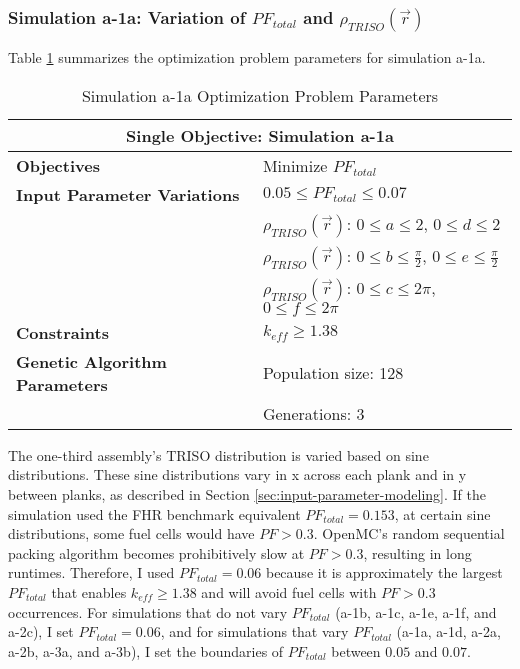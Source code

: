 \subsubsection{Simulation a-1a: Variation of $PF_{total}$ and $\rho_{TRISO}(\vec{r})$}
Table \ref{tab:simulationa1a}  summarizes the optimization problem parameters for 
simulation a-1a.
\begin{table}[htbp!]
    \centering
    \onehalfspacing
    \caption{Simulation a-1a Optimization Problem Parameters}
	\label{tab:simulationa1a}
    \footnotesize
    \begin{tabular}{l|p{5.3cm}}
    \hline 
    \multicolumn{2}{c}{\textbf{Single Objective: Simulation a-1a}} \\
    \hline 
    \textbf{Objectives} & Minimize $PF_{total}$ \\
    \hline 
    \textbf{Input Parameter Variations} & $0.05 \leq PF_{total} \leq 0.07$ \\
    & $\rho_{TRISO}(\vec{r})$: $0 \leq a \leq 2$, $0 \leq d \leq 2$\\
    & $\rho_{TRISO}(\vec{r})$: $0 \leq b \leq \frac{\pi}{2}$, $0 \leq e \leq \frac{\pi}{2}$\\
    & $\rho_{TRISO}(\vec{r})$: $0 \leq c \leq 2\pi$, $0 \leq f \leq 2\pi$\\
    \hline
    \textbf{Constraints} & $k_{eff} \geq 1.38$\\ 
    \hline 
    \textbf{Genetic Algorithm Parameters} & Population size: 128 \\
    & Generations: 3 \\
    \hline
    \end{tabular}
\end{table}
The one-third assembly's TRISO distribution is varied based on sine distributions. 
These sine distributions vary in x across each plank and in y between planks, 
as described in Section \ref{sec:input-parameter-modeling}. 
If the simulation used the FHR benchmark equivalent $PF_{total} = 0.153$, at
certain sine distributions, some fuel cells would have $PF > 0.3$. 
OpenMC's random sequential packing algorithm becomes prohibitively slow at $PF > 0.3$, 
resulting in long runtimes. 
Therefore, I used $PF_{total} = 0.06$ because it is approximately the largest 
$PF_{total}$ that enables $k_{eff} \geq 1.38$ and will avoid fuel cells with 
$PF > 0.3$ occurrences. 
For simulations that do not vary $PF_{total}$ (a-1b, a-1c, a-1e, a-1f, and a-2c), 
I set $PF_{total} = 0.06$, and for simulations that vary $PF_{total}$ 
(a-1a, a-1d, a-2a, a-2b, a-3a, and a-3b), I set the boundaries of $PF_{total}$ 
between $0.05$ and $0.07$.

